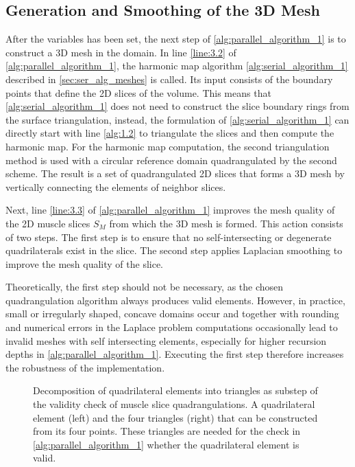 
\subsection{Generation and Smoothing of the 3D Mesh}

After the  variables has been set, the next step of \cref{alg:parallel_algorithm_1} is to construct a 3D mesh in the domain.
In line \ref{line:3.2} of \cref{alg:parallel_algorithm_1}, the harmonic map  algorithm \cref{alg:serial_algorithm_1} described in \cref{sec:ser_alg_meshes} is called. Its input consists of the boundary points that define the 2D slices of the volume. This means that \cref{alg:serial_algorithm_1} does not need to construct the slice boundary rings from the surface triangulation, instead, the formulation of \cref{alg:serial_algorithm_1} can directly start with line \ref{alg:1.2} to triangulate the slices and then compute the harmonic map. For the harmonic map computation, the second triangulation method is used with a circular reference domain quadrangulated by the second scheme. The result is a set of quadrangulated 2D slices that forms a 3D mesh by vertically connecting the elements of neighbor slices.

Next, line \ref{line:3.3} of \cref{alg:parallel_algorithm_1} improves the mesh quality of the 2D muscle slices $S_M$ from which the 3D mesh is formed. This action consists of two steps. The first step is to ensure that no self-intersecting or degenerate quadrilaterals exist in the slice. The second step applies Laplacian smoothing to improve the mesh quality of the slice.

Theoretically, the first step should not be necessary, as the chosen quadrangulation algorithm always produces valid elements. However, in practice, small or irregularly shaped, concave domains occur and together with rounding and numerical errors in the Laplace problem computations occasionally lead to invalid meshes with self intersecting elements, especially for higher recursion depths in \cref{alg:parallel_algorithm_1}. Executing the first step therefore increases the robustness of the implementation.

\begin{figure}%
  \centering%
  \def\svgwidth{0.7\textwidth}%
  \caption{Decomposition of quadrilateral elements into triangles as substep of the validity check of muscle slice quadrangulations. A quadrilateral element (left) and the four triangles (right) that can be constructed from its four points. These triangles are needed for the check in \cref{alg:parallel_algorithm_1} whether the quadrilateral element is valid.}%
  \label{fig:quads_tris}%
\end{figure}%

